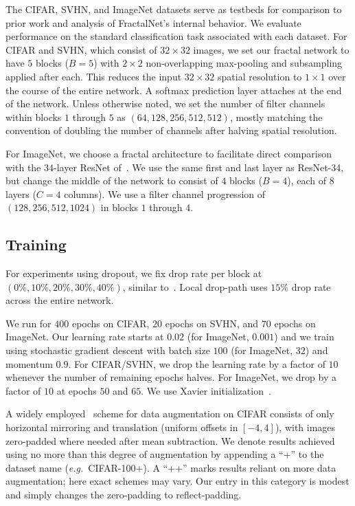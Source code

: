 \documentclass{article}
\def\eg{\emph{e.g.}}
\newcommand{\fracnet}{FractalNet}
\newcommand{\resnet}{ResNet}
\newcommand{\dropout}{dropout}
\newcommand{\droppath}{drop-path}
\begin{document}
The CIFAR, SVHN, and ImageNet datasets serve as testbeds for comparison to
prior work and analysis of {\fracnet}'s internal behavior.  We evaluate
performance on the standard classification task associated with each
dataset.  For CIFAR and SVHN, which consist of $32 \times 32$ images, we set
our fractal network to have $5$ blocks ($B=5$) with $2 \times 2$
non-overlapping max-pooling and subsampling applied after each.  This reduces
the input $32 \times 32$ spatial resolution to $1 \times 1$ over the course of
the entire network.  A softmax prediction layer attaches at the end of the
network.  Unless otherwise noted, we set the number of filter channels within
blocks $1$ through $5$ as $(64, 128, 256, 512, 512)$, mostly matching the
convention of doubling the number of channels after halving spatial resolution.

For ImageNet, we choose a fractal architecture to facilitate direct comparison
with the $34$-layer {\resnet} of~\cite{he2015deep}.  We use the same first and
last layer as {\resnet}-34, but change the middle of the network to consist of
$4$ blocks ($B=4$), each of $8$ layers ($C=4$ columns).  We use a filter
channel progression of $(128, 256, 512, 1024)$ in blocks $1$ through $4$.

\subsection{Training}
\label{sec:training}

For experiments using {\dropout}, we fix drop rate per block at
$(0\%, 10\%, 20\%, 30\%, 40\%)$, similar to~\cite{elu}.  Local {\droppath}
uses $15\%$ drop rate across the entire network.

We run for $400$ epochs on CIFAR, $20$ epochs on SVHN, and $70$ epochs on
ImageNet.  Our learning rate starts at $0.02$ (for ImageNet, $0.001$) and we
train using stochastic gradient descent with batch size $100$ (for ImageNet,
$32$) and momentum $0.9$.  For CIFAR/SVHN, we drop the learning rate by a
factor of $10$ whenever the number of remaining epochs halves.  For ImageNet,
we drop by a factor of $10$ at epochs $50$ and $65$.  We use Xavier
initialization~\citep{glorot2010understanding}.

A widely employed~\citep{nin,elu,srivastava2015highway,he2015deep,
he2016identity,huang2016stochasticdepth,rir} scheme for data augmentation on
CIFAR consists of only horizontal mirroring and translation (uniform offsets
in $[-4,4]$), with images zero-padded where needed after mean subtraction.
We denote results achieved using no more than this degree of augmentation by
appending a ``+'' to the dataset name (\eg~CIFAR-100+).  A ``++'' marks
results reliant on more data augmentation; here exact schemes may vary.  Our
entry in this category is modest and simply changes the zero-padding to
reflect-padding.
\end{document}
